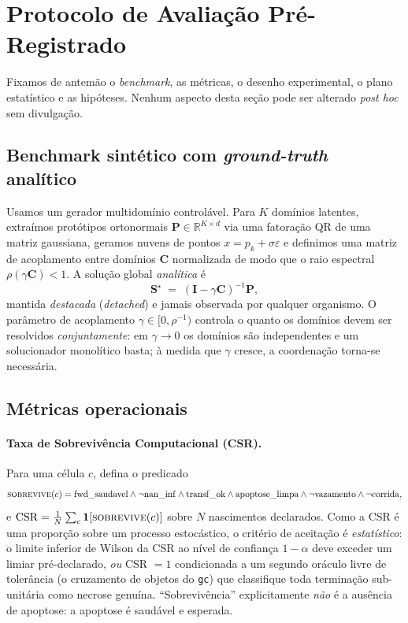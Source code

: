\documentclass[11pt]{article}
\newcommand{\R}{\mathbb{R}}
\newcommand{\Iden}{\mathbf{I}}
\begin{document}
\section{Protocolo de Avaliação Pré-Registrado}
\label{sec:protocol}
Fixamos de antemão o \emph{benchmark}, as métricas, o desenho experimental, o
plano estatístico e as hipóteses. Nenhum aspecto desta seção pode ser alterado
\emph{post hoc} sem divulgação.

\subsection{Benchmark sintético com \emph{ground-truth} analítico}
Usamos um gerador multidomínio controlável. Para $K$ domínios latentes, extraímos
protótipos ortonormais $\mathbf{P}\in\R^{K\times d}$ via uma fatoração QR de uma
matriz gaussiana, geramos nuvens de pontos $x=p_k+\sigma\varepsilon$ e definimos
uma matriz de acoplamento entre domínios $\mathbf{C}$ normalizada de modo que o
raio espectral $\rho(\gamma\mathbf{C})<1$. A solução global \emph{analítica} é
\begin{equation}
\mathbf{S}^\star \;=\; (\Iden - \gamma\mathbf{C})^{-1}\mathbf{P},
\label{eq:groundtruth}
\end{equation}
mantida \emph{destacada} (\emph{detached}) e jamais observada por qualquer
organismo. O parâmetro de acoplamento $\gamma\in[0,\rho^{-1})$ controla o quanto
os domínios devem ser resolvidos \emph{conjuntamente}: em $\gamma\to0$ os domínios
são independentes e um solucionador monolítico basta; à medida que $\gamma$
cresce, a coordenação torna-se necessária.

\subsection{Métricas operacionais}
\paragraph{Taxa de Sobrevivência Computacional (CSR).}
Para uma célula $c$, defina o predicado
\begin{equation}
\textsc{sobrevive}(c) = \mathrm{fwd\_saudavel} \wedge \neg\mathrm{nan\_inf}
\wedge \mathrm{transf\_ok} \wedge \mathrm{apoptose\_limpa}
\wedge \neg\mathrm{vazamento} \wedge \neg\mathrm{corrida},
\end{equation}
e $\mathrm{CSR}=\frac{1}{N}\sum_{c}\mathbf{1}[\textsc{sobrevive}(c)]$ sobre $N$
nascimentos declarados. Como a CSR é uma proporção sobre um processo estocástico,
o critério de aceitação é \emph{estatístico}: o limite inferior de Wilson
\cite{wilson1927interval} da CSR ao nível de confiança $1-\alpha$ deve exceder um
limiar pré-declarado, \emph{ou} CSR $=1$ condicionada a um segundo oráculo livre
de tolerância (o cruzamento de objetos do \texttt{gc}) que classifique toda
terminação sub-unitária como necrose genuína. ``Sobrevivência'' explicitamente
\emph{não} é a ausência de apoptose: a apoptose é saudável e esperada.
\end{document}
